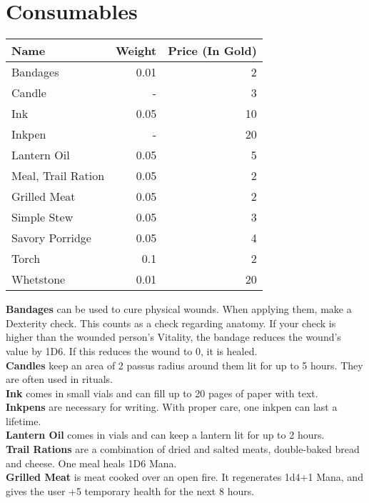 \section{Consumables}
\begin{longtable}{l | r | r}
	Name & Weight & Price (In Gold)\\ \hline
	Bandages & 0.01 & 2\\
	Candle & - & 3\\
	Ink & 0.05 & 10\\
	Inkpen & - & 20\\
	Lantern Oil & 0.05 & 5\\
	Meal, Trail Ration & 0.05 & 2\\
	Grilled Meat & 0.05 & 2\\
	Simple Stew & 0.05 & 3\\
	Savory Porridge & 0.05 & 4\\
	Torch & 0.1 & 2\\
	Whetstone & 0.01 & 20\\
\end{longtable}


\textbf{Bandages} can be used to cure physical wounds. When applying them, make a Dexterity check. This counts as a check regarding anatomy. If your check is higher than the wounded person's Vitality, the bandage reduces the wound's value by 1D6. If this reduces the wound to 0, it is healed.\\


\textbf{Candles} keep an area of 2 passus radius around them lit for up to 5 hours. They are often used in rituals.\\


\textbf{Ink} comes in small vials and can fill up to 20 pages of paper with text.\\


\textbf{Inkpens} are necessary for writing. With proper care, one inkpen can last a lifetime.\\


\textbf{Lantern Oil} comes in vials and can keep a lantern lit for up to 2 hours.\\


\textbf{Trail Rations} are a combination of dried and salted meats, double-baked bread and cheese. One meal heals 1D6 Mana.\\


\textbf{Grilled Meat} is meat cooked over an open fire. It regenerates 1d4+1 Mana, and gives the user +5 temporary health for the next 8 hours.\\


